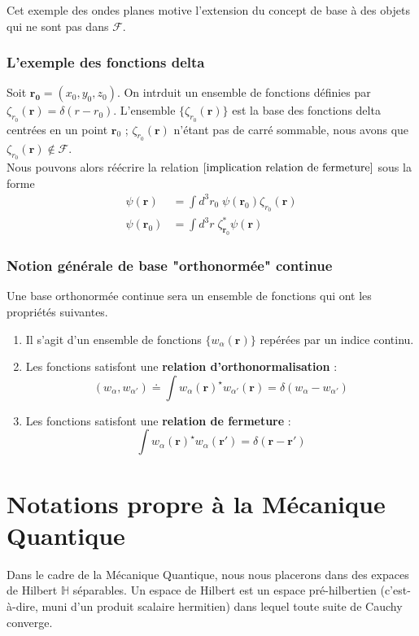 \documentclass[../notesdecours.tex]{subfiles}
\begin{document}
Cet exemple des ondes planes motive l'extension du concept de base à des objets qui ne sont pas dans $\mathcal{F}$.
\subsubsection{L'exemple des fonctions delta}
Soit $\bm{r_0} = (x_0,y_0,z_0)$. On intrduit un ensemble de fonctions définies par $\zeta_{r_0} (\bm{r}) = \delta(r-r_0)$. L'ensemble $\{\zeta_{r_0}(\bm{r})\}$ est la base des fonctions delta centrées en un point $\bm{r}_0$ ; $\zeta_{r_0} (\bm{r})$ n'étant pas de carré sommable, nous avons que $\zeta_{r_0} (\bm{r}) \notin \mathcal{F}$.\\

Nous pouvons alors réécrire la relation $\eqref{implication relation de fermeture}$ sous la forme
\begin{align}
\psi (\bm{r}) &= \int d^3r_0 \; \psi(\bm{r}_0)\zeta_{r_0} (\bm{r})\\
\psi (\bm{r}_0) &= \int d^3r \; \zeta_{\bm{r}_0}^* \psi(\bm{r})
\end{align}

\subsubsection{Notion générale de base "orthonormée" continue}
Une base orthonormée continue sera un ensemble de fonctions qui ont les propriétés suivantes.
\begin{enumerate}
\item Il s'agit d'un ensemble de fonctions $\{ w_\alpha(\bm{r})\}$ repérées par un indice continu. \\

\item Les fonctions satisfont une \textbf{relation d'orthonormalisation} :
$$(w_{\alpha}, w_{\alpha'}) \doteq \int w_{\alpha}(\bm{r})^\star w_{\alpha'}(\bm{r}) = \delta(w_{\alpha} - w_{\alpha'})$$

\item Les fonctions satisfont une \textbf{relation de fermeture} :
$$\int w_{\alpha}(\bm{r})^\star w_{\alpha}(\bm{r}') = \delta(\bm{r}-\bm{r}')$$
\end{enumerate}
\section{Notations propre à la Mécanique Quantique}
Dans le cadre de la Mécanique Quantique, nous nous placerons dans des expaces de Hilbert $\mathbb{H}$ séparables. Un espace de Hilbert est un espace pré-hilbertien (c'est-à-dire, muni d'un produit scalaire hermitien) dans lequel toute suite de Cauchy converge. \\
\end{document}
